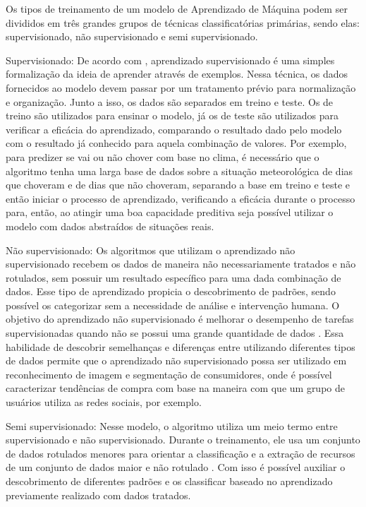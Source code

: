 Os tipos de treinamento de um modelo de Aprendizado de Máquina podem
ser divididos em três grandes grupos de técnicas classificatórias
primárias, sendo elas: supervisionado, não supervisionado e semi
supervisionado.

Supervisionado: De acordo com , aprendizado
supervisionado é uma simples formalização da ideia de aprender através
de exemplos. Nessa técnica, os dados fornecidos ao modelo devem passar
por um tratamento prévio para normalização e organização. Junto a
isso, os dados são separados em treino e teste. Os de treino são
utilizados para ensinar o modelo, já os de teste são utilizados para
verificar a eficácia do aprendizado, comparando o resultado dado pelo
modelo com o resultado já conhecido para aquela combinação de
valores. Por exemplo, para predizer se vai ou não chover com base no
clima, é necessário que o algoritmo tenha uma larga base de dados
sobre a situação meteorológica de dias que choveram e de dias que não
choveram, separando a base em treino e teste e então iniciar o
processo de aprendizado, verificando a eficácia durante o processo
para, então, ao atingir uma boa capacidade preditiva seja possível
utilizar o modelo com dados abstraídos de situações reais.

Não supervisionado: Os algoritmos que utilizam o aprendizado não
supervisionado recebem os dados de maneira não necessariamente
tratados e não rotulados, sem possuir um resultado específico para uma
dada combinação de dados. Esse tipo de aprendizado propicia o
descobrimento de padrões, sendo possível os categorizar sem a
necessidade de análise e intervenção humana. O objetivo do aprendizado
não supervisionado é melhorar o desempenho de tarefas supervisionadas
quando não se possui uma grande quantidade de dados
\cite{sutskever2015}. Essa habilidade de descobrir semelhanças e
diferenças entre utilizando diferentes tipos de dados permite que o
aprendizado não supervisionado possa ser utilizado em reconhecimento
de imagem e segmentação de consumidores, onde é possível caracterizar
tendências de compra com base na maneira com que um grupo de usuários
utiliza as redes sociais, por exemplo.

Semi supervisionado: Nesse modelo, o algoritmo utiliza um meio termo
entre supervisionado e não supervisionado. Durante o treinamento, ele
usa um conjunto de dados rotulados menores para orientar a
classificação e a extração de recursos de um conjunto de dados maior e
não rotulado \cite{uibm2022}. Com isso é possível auxiliar o
descobrimento de diferentes padrões e os classificar baseado no
aprendizado previamente realizado com dados tratados.

